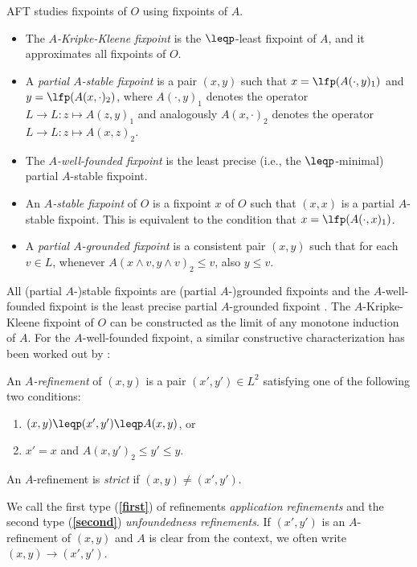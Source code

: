 AFT studies fixpoints of $O$ using fixpoints of $A$. 
 \begin{itemize}
  \item The \emph{$A$-Kripke-Kleene fixpoint} is the $\leqp$-least fixpoint of $A$, and it approximates all fixpoints of $O$. 
\item A \emph{partial $A$-stable fixpoint} is a pair  $(x,y)$ such that $x=\lfp(A(\cdot,y)_1)$ and $y=\lfp(A(x,\cdot)_2)$, where $A(\cdot,y)_1$ denotes the operator $L\to L:z\mapsto A(z,y)_1$ and analogously  $A(x,\cdot)_2$ denotes the operator $L\to L:z\mapsto A(x,z)_2$. 
\item The \emph{$A$-well-founded fixpoint} is the least precise (i.e., the $\leqp$-minimal) partial $A$-stable fixpoint.
\item  An \emph{$A$-stable fixpoint} of $O$ is a fixpoint $x$ of $O$ such that $(x,x)$ is a partial $A$-stable fixpoint. This is equivalent to the condition that $x=\lfp(A(\cdot, x)_1)$.
\item A \emph{partial $A$-grounded fixpoint} is a consistent pair $(x,y)$ such that for each $v\in L$, whenever $A(x\land v, y\land v)_2 \leq v$, also $y\leq v$. 
 \end{itemize}
 
 All (partial $A$-)stable fixpoints are (partial $A$-)grounded fixpoints and the $A$-well-founded fixpoint is the least precise partial $A$-grounded fixpoint . 
The $A$-Kripke-Kleene fixpoint of $O$ can be constructed as the limit of any monotone induction of $A$. 
For the $A$-well-founded fixpoint, a similar constructive characterization has been worked out by \citet{lpnmr/DeneckerV07}:

\begin{definition}\label{002:def:refinement}
An \emph{$A$-refinement} of $(x,y)$ is a pair $(x',y')\in L^2$ satisfying one of the following two conditions:
\begin{enumerate}
	\item $(x,y)\leqp(x',y')\leqp A(x,y)$, or \label{first}
	\item $x'=x$ and  $A(x,y')_2\leq y'\leq y$. \label{second}
\end{enumerate}
An $A$-refinement is \emph{strict} if $(x,y)\neq (x',y')$.
\end{definition}

We call the first type (\textbf{\ref{first}}) of refinements \emph{application refinements} and the second type (\textbf{\ref{second}}) \emph{unfoundedness refinements}. If $(x',y')$ is an $A$-refinement of $(x,y)$ and $A$ is clear from the context, we often write $(x,y)\to(x',y')$.
%

